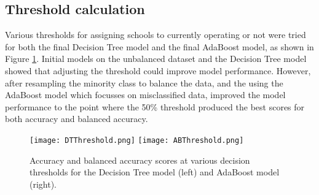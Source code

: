 \documentclass[11pt, letterpaper]{article}
\begin{document}
\subsection{Threshold calculation}

Various thresholds for assigning schools to currently operating or not were tried for both the final Decision Tree model and the final AdaBoost model, as shown in Figure \ref{fig:Thresholds}. Initial models on the unbalanced dataset and the Decision Tree model showed that adjusting the threshold could improve model performance. However, after resampling the minority class to balance the data, and the using the AdaBoost model which focusses on misclassified data, improved the model performance to the point where the 50\% threshold produced the best scores for both accuracy and balanced accuracy.

\begin{figure}[h]
\begin{center}
\texttt{[image: DTThreshold.png]}
\texttt{[image: ABThreshold.png]}
\caption{Accuracy and balanced accuracy scores at various decision thresholds for the Decision Tree model (left) and AdaBoost model (right).} 
\label{fig:Thresholds}
\end{center}
\end{figure}
\end{document}
